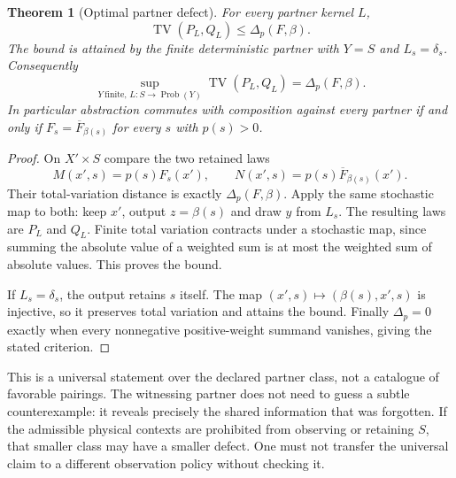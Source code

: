 \documentclass[11pt]{article}
\newtheorem{theorem}{Theorem}\newtheorem{proposition}{Proposition}\newtheorem{corollary}{Corollary}\newtheorem{definition}{Definition}
\newcommand{\TV}{\operatorname{TV}}\newcommand{\Prob}{\mathsf{Prob}}
\begin{document}
\begin{theorem}[Optimal partner defect]\label{sep-optimal}
For every partner kernel $L$,
\[
 \TV(P_L,Q_L)\le\Delta_p(F,\beta).
\]
The bound is attained by the finite deterministic partner with $Y=S$ and $L_s=\delta_s$. Consequently
\[
 \sup_{Y\ \mathrm{finite},\,L:S\to\operatorname{Prob}(Y)}
       \TV(P_L,Q_L)=\Delta_p(F,\beta).
\]
In particular abstraction commutes with composition against every partner if and only if $F_s=\overline F_{\beta(s)}$ for every $s$ with $p(s)>0$.
\end{theorem}
\begin{proof}
On $X'\times S$ compare the two retained laws
\[
 M(x',s)=p(s)F_s(x'),\qquad
 N(x',s)=p(s)\overline F_{\beta(s)}(x').
\]
Their total-variation distance is exactly $\Delta_p(F,\beta)$. Apply the same stochastic map to both: keep $x'$, output $z=\beta(s)$ and draw $y$ from $L_s$. The resulting laws are $P_L$ and $Q_L$. Finite total variation contracts under a stochastic map, since summing the absolute value of a weighted sum is at most the weighted sum of absolute values. This proves the bound.

If $L_s=\delta_s$, the output retains $s$ itself. The map $(x',s)\mapsto(\beta(s),x',s)$ is injective, so it preserves total variation and attains the bound. Finally $\Delta_p=0$ exactly when every nonnegative positive-weight summand vanishes, giving the stated criterion.
\end{proof}

This is a universal statement over the declared partner class, not a catalogue of favorable pairings. The witnessing partner does not need to guess a subtle counterexample: it reveals precisely the shared information that was forgotten. If the admissible physical contexts are prohibited from observing or retaining $S$, that smaller class may have a smaller defect. One must not transfer the universal claim to a different observation policy without checking it.
\end{document}
